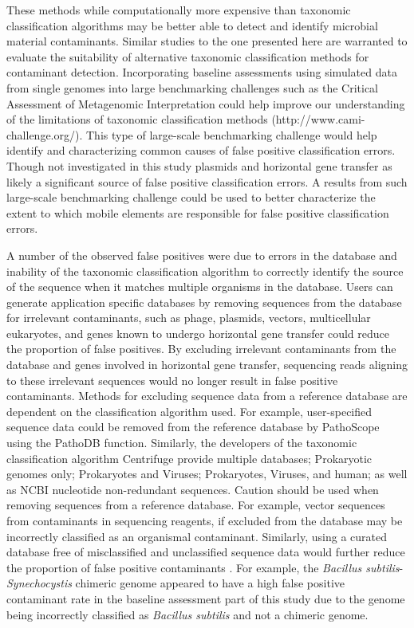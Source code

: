 \documentclass[fleqn,10pt,lineno]{wlpeerj}\usepackage[]{graphicx}\usepackage[]{color}
\begin{document}
These methods while computationally more expensive than taxonomic classification algorithms may be better able to detect and identify microbial material contaminants. 
Similar studies to the one presented here are warranted to evaluate the suitability of alternative taxonomic classification methods for contaminant detection. 
Incorporating baseline assessments using simulated data from single genomes into large benchmarking challenges such as the Critical Assessment of Metagenomic Interpretation could help improve our understanding of the limitations of taxonomic classification methods (http://www.cami-challenge.org/)\citep{sczyrba2017critical}. 
This type of large-scale benchmarking challenge would help identify and characterizing common causes of false positive classification errors. 
Though not investigated in this study plasmids and horizontal gene transfer as likely a significant source of false positive classification errors. 
A results from such large-scale benchmarking challenge could be used to better characterize the extent to which mobile elements are responsible for false positive classification errors. 

A number of the observed false positives were due to errors in the database and inability of the taxonomic classification algorithm to correctly identify the source of the sequence when it matches multiple organisms in the database. 
Users can generate application specific databases by removing sequences from the database for irrelevant contaminants, such as phage, plasmids, vectors, multicellular eukaryotes, and genes known to undergo horizontal gene transfer could reduce the proportion of false positives. 
By excluding irrelevant contaminants from the database and genes involved in horizontal gene transfer, sequencing reads aligning to these irrelevant sequences would no longer result in false positive contaminants.
Methods for excluding sequence data from a reference database are dependent on the classification algorithm used.
For example, user-specified sequence data could be removed from the reference database by PathoScope using the PathoDB function.
Similarly, the developers of the taxonomic classification algorithm Centrifuge provide multiple databases; Prokaryotic genomes only; Prokaryotes and Viruses; Prokaryotes, Viruses, and human; as well as NCBI nucleotide non-redundant sequences. 
Caution should be used when removing sequences from a reference database.
For example, vector sequences from contaminants in sequencing reagents, if excluded from the database may be incorrectly classified as an organismal contaminant.
Similarly, using a curated database free of misclassified and unclassified sequence data would further reduce the proportion of false positive contaminants \citep{tennessen2015prodege}.
For example, the \textit{Bacillus subtilis}-\textit{Synechocystis} chimeric genome appeared to have a high false positive contaminant rate in the baseline assessment part of this study due to the genome being incorrectly classified as \textit{Bacillus subtilis} and not a chimeric genome.
\end{document}

